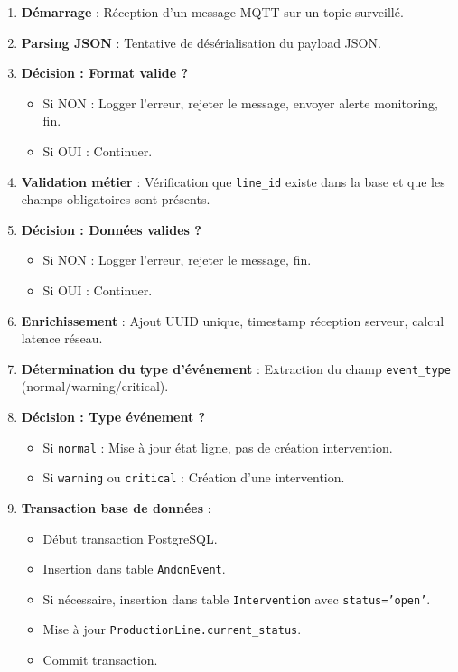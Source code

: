 \begin{enumerate}
    \item \textbf{Démarrage} : Réception d'un message MQTT sur un topic surveillé.
    
    \item \textbf{Parsing JSON} : Tentative de désérialisation du payload JSON.
    
    \item \textbf{Décision : Format valide ?}
    \begin{itemize}
        \item Si NON : Logger l'erreur, rejeter le message, envoyer alerte monitoring, fin.
        \item Si OUI : Continuer.
    \end{itemize}
    
    \item \textbf{Validation métier} : Vérification que \texttt{line\_id} existe dans la base et que les champs obligatoires sont présents.
    
    \item \textbf{Décision : Données valides ?}
    \begin{itemize}
        \item Si NON : Logger l'erreur, rejeter le message, fin.
        \item Si OUI : Continuer.
    \end{itemize}
    
    \item \textbf{Enrichissement} : Ajout UUID unique, timestamp réception serveur, calcul latence réseau.
    
    \item \textbf{Détermination du type d'événement} : Extraction du champ \texttt{event\_type} (normal/warning/critical).
    
    \item \textbf{Décision : Type événement ?}
    \begin{itemize}
        \item Si \texttt{normal} : Mise à jour état ligne, pas de création intervention.
        \item Si \texttt{warning} ou \texttt{critical} : Création d'une intervention.
    \end{itemize}
    
    \item \textbf{Transaction base de données} :
    \begin{itemize}
        \item Début transaction PostgreSQL.
        \item Insertion dans table \texttt{AndonEvent}.
        \item Si nécessaire, insertion dans table \texttt{Intervention} avec \texttt{status='open'}.
        \item Mise à jour \texttt{ProductionLine.current\_status}.
        \item Commit transaction.
    \end{itemize}
    

\end{enumerate}
